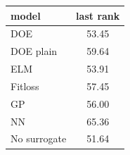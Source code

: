 \begin{tabular}{|lc|}
\hline
model & last rank\\
\hline
DOE & 53.45 \\
DOE plain & 59.64 \\
ELM & 53.91 \\
Fitloss & 57.45 \\
GP & 56.00 \\
NN & 65.36 \\
No surrogate & 51.64 \\
\hline
\end{tabular}

